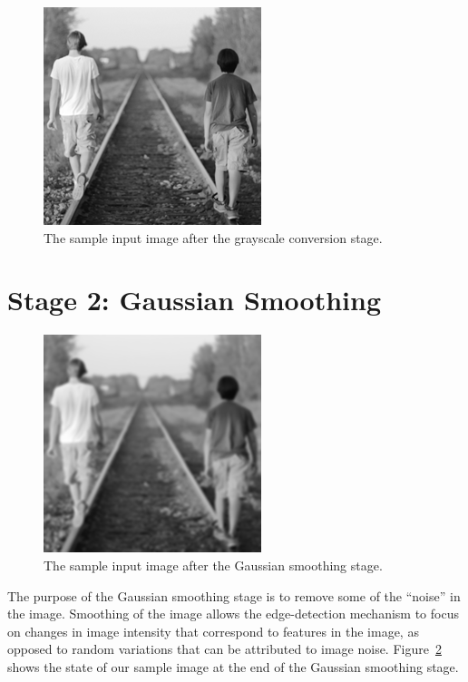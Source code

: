 \documentclass[epsfig,10pt,fullpage]{article}
\begin{document}
\begin{figure}[h]
   \begin{center}
       \includegraphics[scale = 0.85]{figures/fig_stage1_grayscale.png}
   \end{center}
   \caption{The sample input image after the grayscale conversion stage.}
	\label{fig:sample_stage1}
\end{figure}

\noindent
\section*{Stage 2: Gaussian Smoothing}

\begin{figure}[h]
   \begin{center}
       \includegraphics[scale = 0.85]{figures/fig_stage2_gaussian.png}
   \end{center}
   \caption{The sample input image after the Gaussian smoothing stage.}
	\label{fig:sample_stage2}
\end{figure}

The purpose of the Gaussian smoothing stage is to remove some of the ``noise'' in the image. Smoothing of
the image allows the edge-detection mechanism to focus on changes in image intensity that correspond to
features in the image, as opposed to random variations that can be attributed to image noise.
Figure~\ref{fig:sample_stage2} shows the state of our sample image at the end of the Gaussian 
smoothing stage. 
\end{document}
